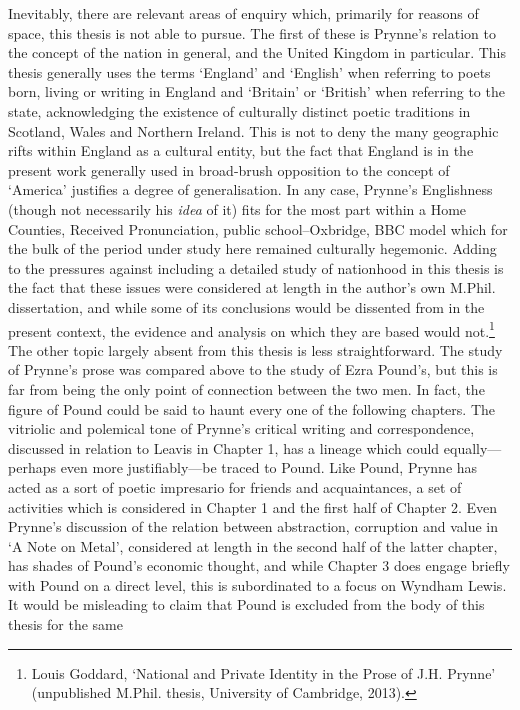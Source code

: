 \documentclass[]{article}
\begin{document}
Inevitably, there are relevant areas of enquiry which, primarily for
reasons of space, this thesis is not able to pursue. The first of these
is Prynne's relation to the concept of the nation in general, and the
United Kingdom in particular. This thesis generally uses the terms
`England' and `English' when referring to poets born, living or writing
in England and `Britain' or `British' when referring to the state,
acknowledging the existence of culturally distinct poetic traditions in
Scotland, Wales and Northern Ireland. This is not to deny the many
geographic rifts within England as a cultural entity, but the fact that
England is in the present work generally used in broad-brush opposition
to the concept of `America' justifies a degree of generalisation. In any
case, Prynne's Englishness (though not necessarily his \emph{idea} of
it) fits for the most part within a Home Counties, Received
Pronunciation, public school--Oxbridge, BBC model which for the bulk of
the period under study here remained culturally hegemonic. Adding to the
pressures against including a detailed study of nationhood in this
thesis is the fact that these issues were considered at length in the
author's own M.Phil. dissertation, and while some of its conclusions
would be dissented from in the present context, the evidence and
analysis on which they are based would not.\footnote{Louis Goddard,
  `National and Private Identity in the Prose of J.H. Prynne'
  (unpublished M.Phil. thesis, University of Cambridge, 2013).} The
other topic largely absent from this thesis is less straightforward. The
study of Prynne's prose was compared above to the study of Ezra Pound's,
but this is far from being the only point of connection between the two
men. In fact, the figure of Pound could be said to haunt every one of
the following chapters. The vitriolic and polemical tone of Prynne's
critical writing and correspondence, discussed in relation to Leavis in
Chapter 1, has a lineage which could equally---perhaps even more
justifiably---be traced to Pound. Like Pound, Prynne has acted as a sort
of poetic impresario for friends and acquaintances, a set of activities
which is considered in Chapter 1 and the first half of Chapter 2. Even
Prynne's discussion of the relation between abstraction, corruption and
value in `A Note on Metal', considered at length in the second half of
the latter chapter, has shades of Pound's economic thought, and while
Chapter 3 does engage briefly with Pound on a direct level, this is
subordinated to a focus on Wyndham Lewis. It would be misleading to
claim that Pound is excluded from the body of this thesis for the same
\end{document}

